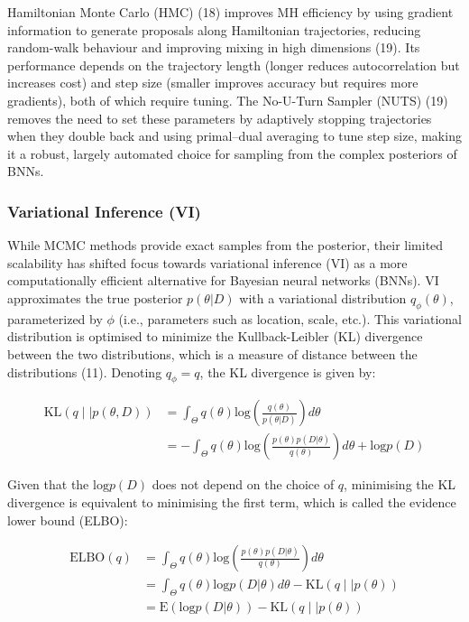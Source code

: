 \documentclass[
  a4paper,
]{scrreprt}
\begin{document}
Hamiltonian Monte Carlo (HMC) (18) improves MH efficiency by using
gradient information to generate proposals along Hamiltonian
trajectories, reducing random-walk behaviour and improving mixing in
high dimensions (19). Its performance depends on the trajectory length
(longer reduces autocorrelation but increases cost) and step size
(smaller improves accuracy but requires more gradients), both of which
require tuning. The No-U-Turn Sampler (NUTS) (19) removes the need to
set these parameters by adaptively stopping trajectories when they
double back and using primal--dual averaging to tune step size, making
it a robust, largely automated choice for sampling from the complex
posteriors of BNNs.

\subsubsection{Variational Inference (VI)}\label{sec-vi}

While MCMC methods provide exact samples from the posterior, their
limited scalability has shifted focus towards variational inference (VI)
as a more computationally efficient alternative for Bayesian neural
networks (BNNs). VI approximates the true posterior \(p(\theta | D)\)
with a variational distribution \(q_{\phi}(\theta)\), parameterized by
\(\phi\) (i.e., parameters such as location, scale, etc.). This
variational distribution is optimised to minimize the Kullback-Leibler
(KL) divergence between the two distributions, which is a measure of
distance between the distributions (11). Denoting \(q_{\phi}=q\), the KL
divergence is given by:

\[
\begin{aligned}
\text{KL}\left(q \mid \mid p(\theta, D)\right)&=\int_{\Theta}{q(\theta)\text{log}\left(\frac{q(\theta)}{p(\theta|D)}\right)d\theta} \\
&=-\int_{\Theta}{q(\theta)\text{log}\left(\frac{p(\theta)p(D|\theta)}{q(\theta)}\right)d\theta}+\text{log}p(D)
\end{aligned}
\]

Given that the \(\text{log}p(D)\) does not depend on the choice of
\(q\), minimising the KL divergence is equivalent to minimising the
first term, which is called the evidence lower bound (ELBO):

\[
\begin{aligned}
\text{ELBO}(q)&=\int_{\Theta}{q(\theta)\text{log}\left(\frac{p(\theta)p(D|\theta)}{q(\theta)}\right)d\theta} \\
&=\int_{\Theta}{q(\theta)\text{log}p(D|\theta)d\theta}-\text{KL}\left(q \mid \mid p(\theta)\right) \\
&=\text{E}\left(\text{log}p(D|\theta)\right)-\text{KL}\left(q \mid \mid p(\theta)\right)
\end{aligned}
\]
\end{document}
